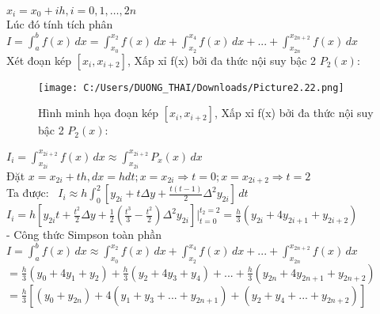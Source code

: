 \documentclass[14pt,a4paper]{article}
\begin{document}
 	   \hspace*{30pt}${\displaystyle x_i=x_0+ih ,i=0,1,…,2n }$ \\
 	   \hspace*{30pt} Lúc đó tính tích phân ${\displaystyle I= \int_{a}^{b}f(x)\,dx =\int_{x_0}^{x_2}f(x)\,dx +\int_{x_2}^{x_4}f(x)\,dx+ ... + \int_{x_{2n}}^{x_{2n+2}}f(x)\,dx}$ \\
 	   \hspace*{30pt} Xét đoạn kép ${\displaystyle  [x_i, x_{i+2}]}$, Xấp xỉ f(x) bởi đa thức nội suy bậc 2 ${\displaystyle P_2 (x): }$ \\ \vspace{9pt}
\begin{figure}[H]
	\centering
	\texttt{[image: C:/Users/DUONG\_THAI/Downloads/Picture2.22.png]}
	\caption[ Hình minh họa đoạn kép ${\displaystyle  [x_i, x_{i+2}]}$, Xấp xỉ f(x) bởi đa thức nội suy bậc 2 ${\displaystyle P_2 (x): }$]{ Hình minh họa đoạn kép ${\displaystyle  [x_i, x_{i+2}]}$, Xấp xỉ f(x) bởi đa thức nội suy bậc 2 ${\displaystyle P_2 (x): }$}
	\label{hinh22}
\end{figure} 	     
 	  \vspace{9pt} \hspace*{30pt} ${\displaystyle I_i= \int_{x_{2i}}^{x_{2i+2}}f(x)\,dx \approx \int_{x_{2i}}^{x_{2i+2}}P_x(x)\,dx}$ \\ 
 	 \vspace*{9pt} \hspace*{30pt} Đặt ${\displaystyle x= x_{2i} +th , dx= hdt ; x=x_{2i} \Rightarrow t=0 ; x= x_{2i+2} \Rightarrow t= 2 }$ \\ 
 	 \vspace{9pt} \hspace*{30pt} Ta được: \,  ${\displaystyle   I_i \approx h \int_{0}^{2}[y_{2i} +t\Delta y +\frac{t(t-1)}{2} \Delta^2y_{2i}]\,dt}$ \\
 	 \vspace{9pt} \hspace*{30pt}  ${\displaystyle I_i  =h[y_{2i} t+  \frac{t^2}{2}  \Delta y + \frac{1}{2} ( \frac {t^3}{3}-\frac{t^2}{2}  ) \Delta ^2 y_{2i} ]|_{t=0}^{t_2=2}  =   \frac{h}{3}(y_{2i}+4y_{2i+1}+y_{2i+2} ) }$\\
 	 \vspace{9pt} \hspace*{30pt} -	Công thức Simpson toàn phần \\
 	 \vspace{9pt} \hspace*{30pt} ${\displaystyle I=\int_{a}^{b}f(x)\,dx \approx \int_{x_0}^{x_2}f(x)\,dx +\int_{x_2}^{x_4}f(x)\,dx+ ... + \int_{x_{2n}}^{x_{2n+2}}f(x)\,dx}$ \\ 
 	 \vspace{9pt} \hspace*{35pt}   ${\displaystyle	=\frac{h}{3}(y_0+4y_1+y_2) +\frac{h}{3}(y_2+4y_3+y_4) + ...+ \frac{h}{3}(y_{2n}+4y_{2n+1}+y_{2n+2}) }$\\
 	 \vspace{9pt} \hspace*{35pt}   ${\displaystyle= \frac{h}{3}[(y_0+y_{2n})+4(y_1+y_3 +...+y_{2n+1})+(y_2+y_4 +...+y_{2n+2})]}$
\end{document}
